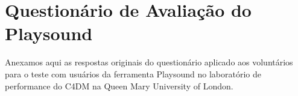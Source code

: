 \chapter{Questionário de Avaliação do Playsound}
\label{ch:questionarios}

Anexamos aqui as respostas originais do questionário aplicado aos voluntários para o teste com usuários da ferramenta Playsound no laboratório de performance do C4DM na Queen Mary University of London. 

